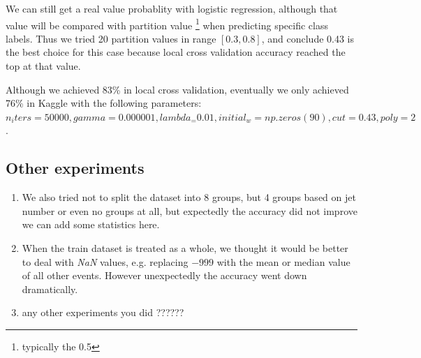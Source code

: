 \documentclass[10pt,conference,compsocconf]{IEEEtran}
\begin{document}
We can still get a real value probablity with logistic regression, although that value will be compared with partition value \footnote{typically the 0.5} when predicting specific class labels. Thus we tried 20 partition values in range $[0.3, 0.8]$, and conclude 0.43 is the best choice for this case because local cross validation accuracy reached the top at that value.

Although we achieved 83\% in local cross validation, eventually we only achieved 76\% in Kaggle with the following parameters: $n_iters = 50000, gamma = 0.000001, lambda_ = 0.01, initial_w = np.zeros(90), cut = 0.43, poly = 2$.


\subsection{Other experiments}
\begin{enumerate}
\item We also tried not to split the dataset into 8 groups, but 4 groups based on jet number or even no groups at all, but expectedly the accuracy did not improve {\color{red} we can add some statistics here}. 
\item When the train dataset is treated as a whole, we thought it would be better to deal with \textit{NaN} values, e.g. replacing $-999$ with the mean or median value of all other events. However unexpectedly the accuracy went down dramatically. 
\item {\color{red}any other experiments you did ??????}
\end{enumerate}



\end{document}
